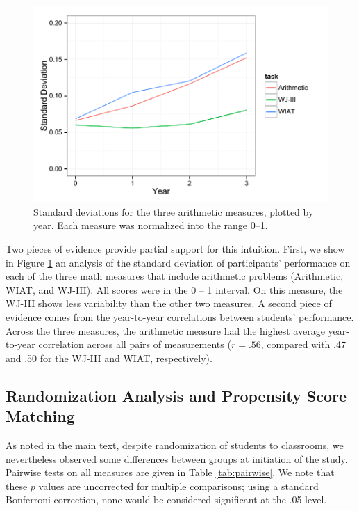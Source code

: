 \documentclass[11pt]{article}
\begin{document}
\begin{figure}[H]
\begin{center}
\includegraphics[width=4.5in]{figures/SDs.pdf}
\end{center}
\caption{Standard deviations for the three arithmetic measures, plotted by year. Each measure was normalized into the range 0--1.}
\label{fig:sds}
\end{figure}

Two pieces of evidence provide partial support for this intuition. First, we show in Figure \ref{fig:sds} an analysis of the standard deviation of participants' performance on each of the three math measures that include arithmetic problems (Arithmetic, WIAT, and WJ-III). All scores were in the 0 -- 1 interval.  On this measure, the WJ-III shows less variability than the other two measures. A second piece of evidence comes from the year-to-year correlations between students' performance. Across the three measures, the arithmetic measure had the highest average year-to-year correlation across all pairs of measurements ($r = .56$, compared with .47 and .50 for the WJ-III and WIAT, respectively). 

\subsection{Randomization Analysis and Propensity Score Matching}

As noted in the main text, despite randomization of students to classrooms, we nevertheless observed some differences between groups at initiation of the study. Pairwise tests on all measures are given in Table \ref{tab:pairwise}. We note that these $p$ values are uncorrected for multiple comparisons; using a standard Bonferroni correction, none would be considered significant at the .05 level. 
\end{document}
